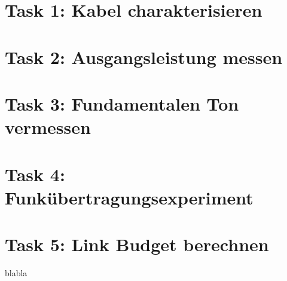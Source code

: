
\section{Task 1: Kabel charakterisieren}
\section{Task 2: Ausgangsleistung messen}
\section{Task 3: Fundamentalen Ton vermessen}
\section{Task 4: Funkübertragungsexperiment}
\section{Task 5: Link Budget berechnen}
blabla
\clearpage